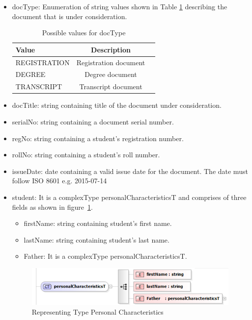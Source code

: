 \documentclass[12pt,a4paper,oneside]{book}
\begin{document}
\begin{itemize}
\item docType: Enumeration of string values shown in Table \ref{tab:docType} describing the document that is under consideration.

\begin{table}[!tbh]
\caption{Possible values for docType}
\label{tab:docType}
\centering
\begin{tabular}[width=\columnwidth]{|p{1.3in}|c|c|}
\hline
Value       		& Description \\
\hline
REGISTRATION 	    & Registration document \\
DEGREE	    		& Degree document \\
TRANSCRIPT	    	& Transcript document \\
\hline
\end{tabular}
\end{table}

\item docTitle: string containing title of the document under consideration.

\item serialNo: string containing a document serial number.
\item regNo: string containing a student's registration number.
\item rollNo: string containing a student's roll number.
\item issueDate: date containing a valid issue date for the document. The date must follow ISO 8601 e.g. 2015-07-14

\item student: It is a complexType personalCharacteristicsT and comprises of three fields as shown in figure~\ref{fig:schema_personalCharacteristicsT}.

	 \begin{itemize}
	 	\item firstName: string containing student's first name.
	 	\item lastName: string containing student's last name.
	 	\item Father: It is a complexType personalCharacteristicsT.
	 \end{itemize}

\begin{figure}[!htp]
  \centering
  \includegraphics[width=14cm]{schema_personalCharacteristicsT.png}
  \caption{Representing Type Personal Characteristics}
  \label{fig:schema_personalCharacteristicsT}
\end{figure}


\end{itemize}
\end{document}
